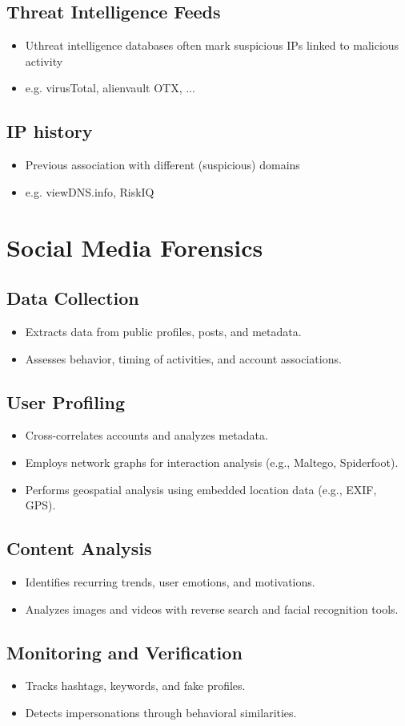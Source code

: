 \subsection{Threat Intelligence Feeds}
\begin{itemize}
    \item Uthreat intelligence databases often mark suspicious IPs linked to malicious activity
    \item e.g. virusTotal, alienvault OTX, ...
\end{itemize}

\subsection{IP history}
\begin{itemize}
    \item Previous association with different (suspicious) domains
    \item e.g. viewDNS.info, RiskIQ
\end{itemize}

\section{Social Media Forensics}
\subsection{Data Collection}
\begin{itemize}
    \item Extracts data from public profiles, posts, and metadata.
    \item Assesses behavior, timing of activities, and account associations.
\end{itemize}

\subsection{User Profiling}
\begin{itemize}
    \item Cross-correlates accounts and analyzes metadata.
    \item Employs network graphs for interaction analysis (e.g., Maltego, Spiderfoot).
    \item Performs geospatial analysis using embedded location data (e.g., EXIF, GPS).
\end{itemize}

\subsection{Content Analysis}
\begin{itemize}
    \item Identifies recurring trends, user emotions, and motivations.
    \item Analyzes images and videos with reverse search and facial recognition tools.
\end{itemize}

\subsection{Monitoring and Verification}
\begin{itemize}
    \item Tracks hashtags, keywords, and fake profiles.
    \item Detects impersonations through behavioral similarities.
\end{itemize}
